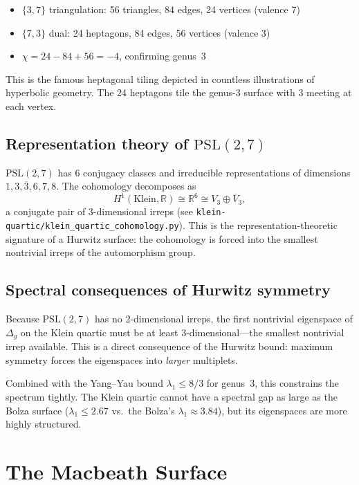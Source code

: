 \documentclass[11pt,a4paper]{article}
\begin{document}
\begin{itemize}[leftmargin=*]
  \item $\{3,7\}$ triangulation: 56 triangles, 84 edges, 24 vertices (valence 7)
  \item $\{7,3\}$ dual: 24 heptagons, 84 edges, 56 vertices (valence 3)
  \item $\chi = 24 - 84 + 56 = -4$, confirming genus~3
\end{itemize}

This is the famous heptagonal tiling depicted in countless illustrations of
hyperbolic geometry. The 24 heptagons tile the genus-3 surface with 3 meeting
at each vertex.

\subsection{Representation theory of $\mathrm{PSL}(2,7)$}

$\mathrm{PSL}(2,7)$ has 6 conjugacy classes and irreducible representations of
dimensions $1, 3, \overline{3}, 6, 7, 8$. The cohomology decomposes as
\[
  H^1(\text{Klein}, \mathbb{R}) \cong \mathbb{R}^6 \cong V_3 \oplus \overline{V}_3,
\]
a conjugate pair of 3-dimensional irreps
(see \texttt{klein-quartic/klein\_quartic\_cohomology.py}). This is the
representation-theoretic signature of a Hurwitz surface: the cohomology is forced
into the smallest nontrivial irreps of the automorphism group.

\subsection{Spectral consequences of Hurwitz symmetry}

Because $\mathrm{PSL}(2,7)$ has no 2-dimensional irreps, the first nontrivial
eigenspace of $\Delta_g$ on the Klein quartic must be at least
3-dimensional---the smallest nontrivial irrep available. This is a direct
consequence of the Hurwitz bound: maximum symmetry forces the eigenspaces into
\emph{larger} multiplets.

Combined with the Yang--Yau bound $\lambda_1 \leq 8/3$ for genus~3,
this constrains the spectrum tightly. The Klein quartic cannot have a spectral
gap as large as the Bolza surface ($\lambda_1 \leq 2.67$ vs.\ the Bolza's
$\lambda_1 \approx 3.84$), but its eigenspaces are more highly structured.

\section{The Macbeath Surface}
\end{document}
